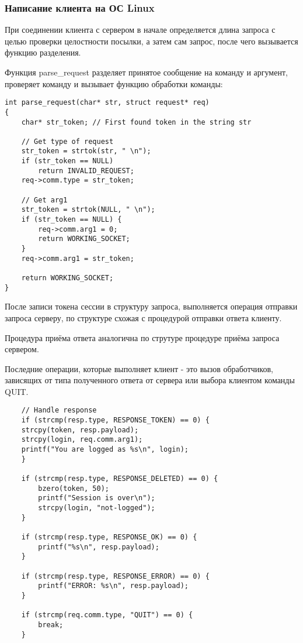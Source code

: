 \subsubsection{Написание клиента на ОС Linux}

При соединении клиента с сервером в начале определяется длина запроса с целью проверки целостности посылки, а затем сам запрос, после чего вызывается функцию разделения. 

Функция parse\_request разделяет принятое сообщение на команду и аргумент, проверяет команду и вызывает функцию обработки команды:

\begin{lstlisting}
int parse_request(char* str, struct request* req)
{
	char* str_token; // First found token in the string str

	// Get type of request
	str_token = strtok(str, " \n");
	if (str_token == NULL)
		return INVALID_REQUEST;
	req->comm.type = str_token;

	// Get arg1
	str_token = strtok(NULL, " \n");
	if (str_token == NULL) {
		req->comm.arg1 = 0;
		return WORKING_SOCKET;
	}
	req->comm.arg1 = str_token;

	return WORKING_SOCKET;
}
\end{lstlisting}

После записи токена сессии в структуру запроса, выполняется операция отправки запроса серверу, по структуре схожая с процедурой отправки ответа клиенту.

Процедура приёма ответа аналогична по струтуре процедуре приёма запроса сервером.

Последние операции, которые выполняет клиент - это вызов обработчиков, зависящих от типа полученного ответа от сервера или выбора клиентом команды QUIT.

\begin{lstlisting}
	// Handle response
	if (strcmp(resp.type, RESPONSE_TOKEN) == 0) {
	strcpy(token, resp.payload);
	strcpy(login, req.comm.arg1);
	printf("You are logged as %s\n", login);
	}
	
	if (strcmp(resp.type, RESPONSE_DELETED) == 0) {
		bzero(token, 50);
		printf("Session is over\n");
		strcpy(login, "not-logged");
	}
	
	if (strcmp(resp.type, RESPONSE_OK) == 0) {
		printf("%s\n", resp.payload);
	}
	
	if (strcmp(resp.type, RESPONSE_ERROR) == 0) {
		printf("ERROR: %s\n", resp.payload);
	}
	
	if (strcmp(req.comm.type, "QUIT") == 0) {
		break;
	}
\end{lstlisting}


